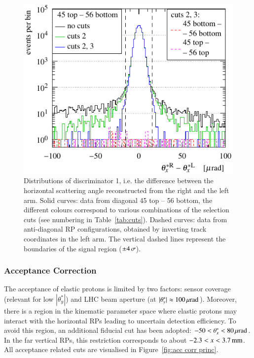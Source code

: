 \begin{figure}
\begin{center}
\includegraphics{fig/cut_distributions.pdf}
\caption{%
Distributions of discriminator 1, i.e. the difference between the horizontal scattering angle reconstructed from the right and the left arm. Solid curves: data from diagonal 45 top -- 56 bottom, the different colours correspond to various combinations of the selection cuts (see numbering in Table~\ref{tab:cuts}). Dashed curves: data from anti-diagonal RP configurations, obtained by inverting track coordinates in the left arm. The vertical dashed lines represent the boundaries of the signal region ($\pm 4\,{\rm \sigma}$).
}
\label{fig:tag bckg}
\end{center}
\end{figure}


\subsubsection{Acceptance Correction}
\label{sec:acc corr}

The acceptance of elastic protons is limited by two factors: sensor coverage (relevant for low $|\theta^*_y|$) and LHC beam aperture (at $|\theta^*_y| \approx 100\,{\rm \mu rad}$). Moreover, there is a region in the kinematic parameter space where elastic protons may interact with the horizontal RPs leading to uncertain detection efficiency. To avoid this region, an additional fiducial cut has been adopted: $-50 < \theta_x^* < 80\,{\rm \mu rad}$. In the far vertical RPs, this restriction corresponds to about $-2.3 < x < 3.7\,{\rm mm}$. All acceptance related cuts are visualised in Figure~\ref{fig:acc corr princ}.

